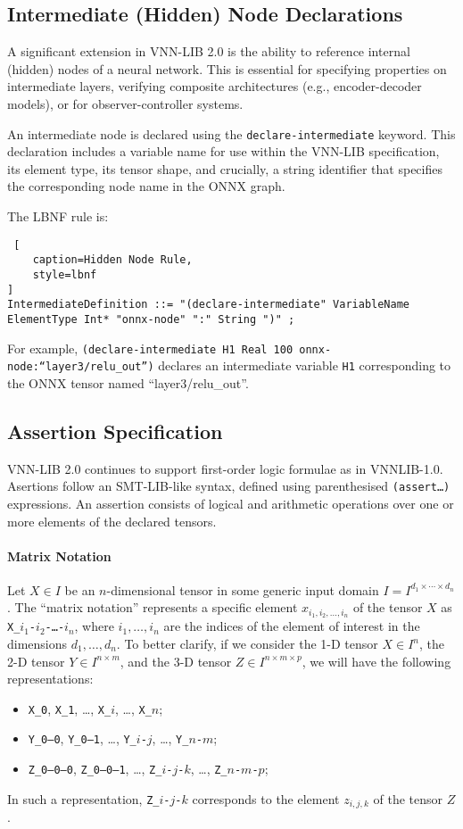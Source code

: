 \subsection{Intermediate (Hidden) Node Declarations}
A significant extension in VNN-LIB 2.0 is the ability to reference internal (hidden) nodes of a neural network. This is essential for specifying properties on intermediate 
layers, verifying composite architectures (e.g., encoder-decoder models), or for observer-controller systems.

An intermediate node is declared using the \texttt{declare-intermediate} keyword. This declaration includes a variable name for use within the VNN-LIB specification, 
its element type, its tensor shape, and crucially, a string identifier that specifies the corresponding node name in the ONNX graph.

The LBNF rule is:
\begin{lstlisting} [
	caption=Hidden Node Rule, 
	style=lbnf
]
IntermediateDefinition ::= "(declare-intermediate" VariableName ElementType Int* "onnx-node" ":" String ")" ;
\end{lstlisting}
For example, \texttt{(declare-intermediate H1 Real 100 onnx-node:``layer3/relu\_out'')} declares an intermediate variable \texttt{H1} corresponding to the 
ONNX tensor named ``layer3/relu\_out''.

\subsection{Assertion Specification}
VNN-LIB 2.0 continues to support first-order logic formulae as in VNNLIB-1.0. Asertions follow an SMT-LIB-like syntax, defined using parenthesised 
\texttt{(assert\ldots)} expressions. An assertion consists of logical and arithmetic operations over one or more elements of the declared tensors.

\paragraph{Matrix Notation}
Let $X \in I$ be an $n$-dimensional tensor in some generic input domain $I = I^{d_1 \times \cdots \times d_n}$. The ``matrix notation'' represents a specific 
element $x_{i_1, i_2, \dots, i_n}$ of the tensor $X$ as \texttt{X\_$i_1$-$i_2$-\dots-$i_n$}, where $i_1, \dots, i_n$ are the indices of the element of interest in the 
dimensions $d_1, \dots, d_n$. To better clarify, if we consider the 1-D tensor $X \in I^n$, the 2-D tensor $Y \in I^{n \times m}$, and the 3-D tensor 
$Z \in I^{n \times m \times p}$, we will have the following representations:
\begin{itemize}
    \item \texttt{X\_0}, \texttt{X\_1}, \dots, \texttt{X\_$i$}, \dots, \texttt{X\_$n$};
    \item \texttt{Y\_0--0}, \texttt{Y\_0--1}, \dots, \texttt{Y\_$i$-$j$}, \dots, \texttt{Y\_$n$-$m$};
    \item \texttt{Z\_0--0--0}, \texttt{Z\_0--0--1}, \dots, \texttt{Z\_$i$-$j$-$k$}, \dots, \texttt{Z\_$n$-$m$-$p$};
\end{itemize}
In such a representation, \texttt{Z\_$i$-$j$-$k$} corresponds to the element $z_{i,j,k}$ of the tensor $Z$. 

